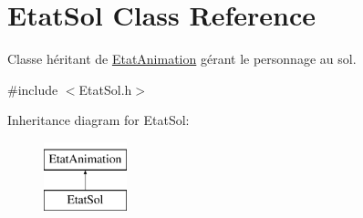 \hypertarget{classEtatSol}{\section{Etat\-Sol Class Reference}
\label{classEtatSol}
}


Classe héritant de \hyperlink{classEtatAnimation}{Etat\-Animation} gérant le personnage au sol.  




{\ttfamily \#include $<$Etat\-Sol.\-h$>$}

Inheritance diagram for Etat\-Sol\-:\begin{figure}[H]
\begin{center}
\leavevmode
\includegraphics[height=2.000000cm]{classEtatSol}
\end{center}
\end{figure}
